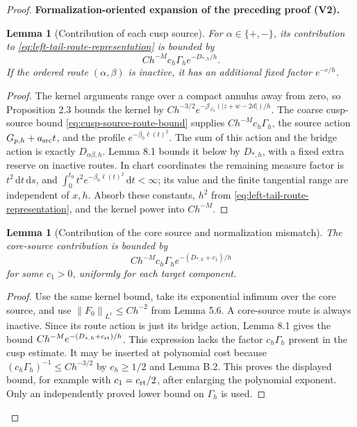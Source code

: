 \documentclass[11pt]{article}
\newtheorem{lemma}[theorem]{Lemma}
\newcommand{\formalisationparentid}{X}
\newenvironment{formalisationaddition}[1]{\par\medskip\begingroup\color{blue}\def\formalisationparentid{#1}\setcounter{formalizationsublemma}{0}\let\lemma\formalizationsublemma\let\endlemma\endformalizationsublemma
  \def\Eo{\mathcal E_h^\circ}\def\EE{\mathcal E_h}\def\phio{\phi_h^\circ}\def\phih{\phi_h}\def\Ho{H_h^{\rm atom}(v^\circ)}\def\Ha{H_h^{\rm atom}}\def\HL{H_h^{L}}\def\Dh{D_h}\def\Log{\operatorname{Log}}\def\ellh{\ell_h}\def\Gp{G_{p,h}}\def\Ast{A_{*,h}}\def\ahat{\widehat{\mathfrak a}_h}\def\ah{\mathfrak a_h}\def\rh{\widehat\rho_h}\def\deltah{\widehat\delta_h}\def\oldref##1{\textup{(##1)}}\def\interface##1{\par\noindent\textit{Analytical interface used here.} ##1\par}\def\finish{\par\noindent\textit{Conclusion of the formalization-oriented expansion.} }\par\noindent\textbf{Formalization-oriented expansion of the preceding proof (V2).}\par\smallskip
}{\par\endgroup\medskip
}
\newcommand{\cJ}{\mathcal J}
\newcommand{\norm}[1]{\left\|#1\right\|}
\begin{document}
\begin{proof}
\begin{formalisationaddition}{L8.2}
\begin{lemma}[Contribution of each cusp source]\label{sublemma:L8-2-cusp-source}
For $\alpha\in\{+,-\}$, its contribution to \eqref{eq:left-tail-route-representation} is bounded by
\[
 Ch^{-M}c_h\Gamma_h e^{-D_{*,h}/h}.
\]
If the ordered route $(\alpha,\beta)$ is inactive, it has an additional fixed factor $e^{-c/h}$.
\end{lemma}
\begin{proof}
The kernel arguments range over a compact annulus away from zero, so Proposition 2.3 bounds the kernel by $Ch^{-3/2}e^{-\cJ_{\EE}(|z+w-2d|)/h}$. The coarse cusp-source bound \eqref{eq:cusp-source-route-bound} supplies $Ch^{-M}c_h\Gamma_h$, the source action $\Gp+a_{\rm src}t$, and the profile $e^{-\beta_0\ell(t)^2}$. The sum of this action and the bridge action is exactly $D_{\alpha\beta,h}$. Lemma 8.1 bounds it below by $D_{*,h}$, with a fixed extra reserve on inactive routes. In chart coordinates the remaining measure factor is $t^2\,\mathrm dt\,\mathrm ds$, and
$\int_0^{t_0}t^2e^{-\beta_0\ell(t)^2}\,\mathrm dt<\infty$; its value and the finite tangential range are independent of $x,h$. Absorb these constants, $h^2$ from \eqref{eq:left-tail-route-representation}, and the kernel power into $Ch^{-M}$.
\end{proof}

\begin{lemma}[Contribution of the core source and normalization mismatch]\label{sublemma:L8-2-core-source}
The core-source contribution is bounded by
\[
 Ch^{-M}c_h\Gamma_h e^{-(D_{*,h}+c_1)/h}
\]
for some $c_1>0$, uniformly for each target component.
\end{lemma}
\begin{proof}
Use the same kernel bound, take its exponential infimum over the core source, and use $\norm{F_0}_{L^1}\le Ch^{-2}$ from Lemma 5.6. A core-source route is always inactive. Since its route action is just its bridge action, Lemma 8.1 gives the bound $Ch^{-M}e^{-(D_{*,h}+c_{\rm rt})/h}$. This expression lacks the factor $c_h\Gamma_h$ present in the cusp estimate. It may be inserted at polynomial cost because
$(c_h\Gamma_h)^{-1}\le C h^{-3/2}$ by $c_h\ge1/2$ and Lemma B.2. This proves the displayed bound, for example with $c_1=c_{\rm rt}/2$, after enlarging the polynomial exponent. Only an independently proved lower bound on $\Gamma_h$ is used.
\end{proof}


\end{formalisationaddition}
\end{proof}
\end{document}

